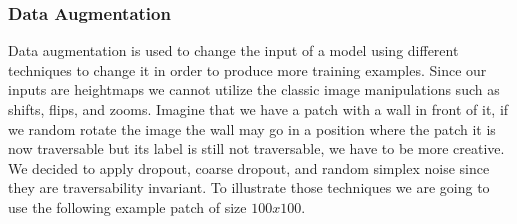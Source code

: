 \documentclass[../document.tex]{subfiles}
\begin{document}
\subsubsection{Data Augmentation}
\label{sec: data-aug}
Data augmentation is used to change the input of a model using different techniques to change it in order to produce more training examples. Since our inputs are heightmaps we cannot utilize the classic image manipulations such as shifts, flips, and zooms. Imagine that we have a patch with a wall in front of it, if we random rotate the image the wall may go in a position where the patch it is now traversable but its label is still not traversable, we have to be more creative. We decided to apply dropout, coarse dropout, and random simplex noise since they are traversability invariant. To illustrate those techniques we are going to use the following example patch of size $100x100$.
\end{document}
